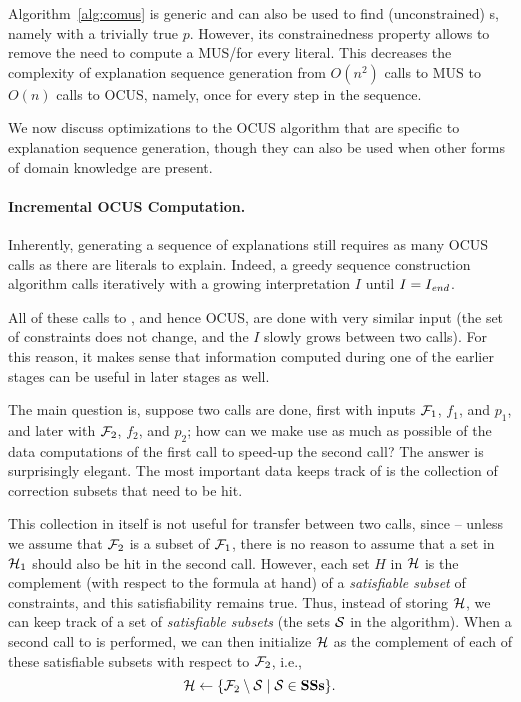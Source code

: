 Algorithm~\ref{alg:comus} is generic and can also be used to find (unconstrained) \omus{}s, namely with a trivially true $p$.
However, its constrainedness property allows to remove the need to compute a MUS/\omus for every literal. This decreases the complexity of explanation sequence generation from $O(n^2)$ calls to MUS to $O(n)$ calls to OCUS, namely, once for every step in the sequence. 

We now discuss optimizations to the OCUS algorithm that are specific to explanation sequence generation, though they can also be used when other forms of domain knowledge are present. 
 
\paragraph{Incremental OCUS Computation.}
Inherently, generating a sequence of explanations still requires as many OCUS calls as there are literals to explain. 
Indeed, a greedy sequence construction algorithm %
calls \onestepo iteratively with a growing interpretation $I$ until $I=I_\mathit{end} $.

All of these calls to \onestepo, and hence OCUS, are done with very similar input (the set of constraints does not change, and the $I$ slowly grows between two calls). For this reason, it makes sense that information computed during one of the earlier stages can be useful in later stages as well. 

The main question is, suppose two \comus calls are done, first with inputs $\mathcal{F} _1$, $f_1$, and $p_1$, and later with $\mathcal{F} _2$, $f_2$, and $p_2$; how can we make use as much as possible of the data computations of the first call to speed-up the second call? The answer is surprisingly elegant. The most important data \comus keeps track of  is the collection \setstohit of correction subsets that need to be hit.

This collection in itself is not useful for transfer between two calls, since -- unless we assume that $\mathcal{F} _2$ is a subset of $\mathcal{F} _1$, there is no reason to assume that a set in $\mathcal{H}_1$ should also be hit in the second call. 
However, each set $H$ in $\mathcal{H}$ is the complement (with respect to the formula at hand) of a \emph{satisfiable subset} of constraints, and this satisfiability remains true. 
Thus, instead of storing $\mathcal{H}$, we can keep track of a set \satsets of \emph{satisfiable subsets} (the sets $\mathcal{S}$ in the \comus algorithm). 
When a second call to \comus is performed, we can then initialize $\mathcal{H}$ as the complement of each of these satisfiable subsets with respect to $\mathcal{F} _2$, i.e., \[\mathcal{H}\gets \{\mathcal{F} _2\setminus \mathcal{S}\mid \mathcal{S}\in \mathbf{SSs}\}.\]

